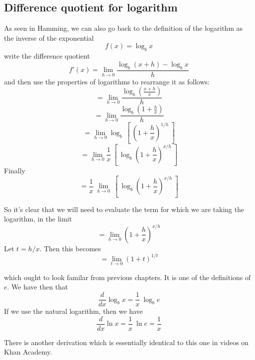 \documentclass[11pt, oneside]{article}
\begin{document}
\subsection*{Difference quotient for logarithm}
As seen in Hamming, we can also go back to the definition of the logarithm as the inverse of the exponential
\[ f(x) = \log_b x \]
write the difference quotient
\[ f'(x) = \lim_{h \rightarrow 0}  \frac{\log_b (x + h) - \log_b x}{h}  \]
and then use the properties of logarithms to rearrange it as follows:
\[ =  \lim_{h \rightarrow 0} \frac{\log_b (\frac{x+h}{x})}{h} \]
\[ =  \lim_{h \rightarrow 0} \frac{\log_b (1 + \frac{h}{x})}{h} \]
\[ =  \lim_{h \rightarrow 0} \log_b \ [ \ (1 + \frac{h}{x})^{1/h} \ ]  \]
\[ =  \lim_{h \rightarrow 0} \frac{1}{x}  \ [ \ \log_b (1 + \frac{h}{x})^{x/h}  \ ]  \]
Finally
\[ =   \frac{1}{x}  \ \lim_{h \rightarrow 0}  \ [ \ \log_b (1 + \frac{h}{x})^{x/h}  \ ]  \]

So it's clear that we will need to evaluate the term for which we are taking the logarithm, in the limit
\[ =  \lim_{h \rightarrow 0} (1 + \frac{h}{x})^{x/h} \]
Let $t = h/x$.  Then this becomes
\[ =  \lim_{t \rightarrow 0} (1 + t)^{1/t} \]

which ought to look familar from previous chapters.  It is one of the definitions of $e$.  We have then that
\[ \frac{d}{dx} \log_b x = \frac{1}{x} \ \log_b e \]
If we use the natural logarithm, then we have
\[ \frac{d}{dx} \ln x = \frac{1}{x} \ \ln e = \frac{1}{x} \]

There is another derivation which is essentially identical to this one in videos on Khan Academy.
\end{document}
